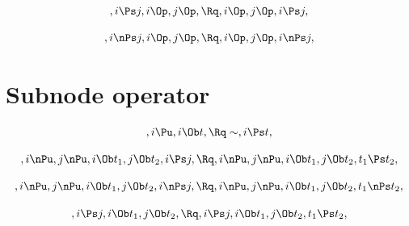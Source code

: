 \[, i \Ps j, i \Op , j \Op, \Rq  ,i \Op , j \Op, i \Ps j,\]

\[, i \nPs j, i \Op , j \Op, \Rq  ,i \Op , j \Op, i \nPs j,\]

\bigskip
\bigskip
\section{Subnode operator}
\[, i \Pu, i \Ob t, \Rq \sim, i \Ps t, \]

\[, i \nPu, j \nPu, i \Ob t_1, j \Ob t_2, i \Ps j, \Rq , i \nPu, j \nPu, i \Ob t_1, j \Ob t_2, t_1 \Ps t_2,\]

\[, i \nPu, j \nPu, i \Ob t_1, j \Ob t_2, i \nPs j, \Rq , i \nPu, j \nPu, i \Ob t_1, j \Ob t_2, t_1 \nPs t_2,\]

\[, i \Ps j, i \Ob t_1, j \Ob t_2, \Rq , i \Ps j, i \Ob t_1, j \Ob t_2, t_1 \Ps t_2,\]

